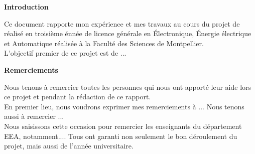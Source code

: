 \documentclass[a4paper]{report}
\begin{document}
\begin{center}
					
		\end{center}
	\pagebreak %
	
		
		\begin{center}
			\textbf{Introduction}
		\end{center}
		{\huge C}e document rapporte mon expérience et mes travaux au cours du projet de réalisé en troisième énnée de licence générale en Électronique, Énergie électrique et Automatique réalisée à la Faculté des Sciences de Montpellier.\\
		
		L'objectif premier de ce projet est de ...

		
		\vspace*{3cm}
		
		\begin{center}
			\textbf{Remerciements}
		\end{center}
	
		{\huge N}ous tenons à remercier toutes les personnes qui nous ont apporté leur aide lors ce projet et pendant la rédaction de ce rapport.\\

En premier lieu, nous voudrons exprimer mes remerciements à ...
Nous tenons aussi à remercier ...\\

Nous saisissons cette occasion pour remercier les enseignants du département EEA, notamment.... Tous ont garanti non seulement le bon déroulement du projet, mais aussi de l'année universitaire.\\

\end{document}
